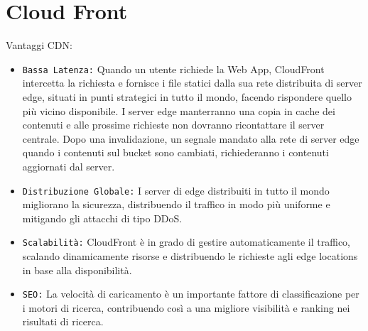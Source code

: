 \section{Cloud Front}

Vantaggi CDN:
\begin{itemize}
    \item \texttt{Bassa Latenza:} Quando un utente richiede la Web App, CloudFront intercetta la richiesta e fornisce i file statici dalla sua rete distribuita di server edge, situati in punti strategici in tutto il mondo, facendo rispondere quello più vicino disponibile. I server edge manterranno una copia in cache dei contenuti e alle prossime richieste non dovranno ricontattare il server centrale. Dopo una invalidazione, un segnale mandato alla rete di server edge quando i contenuti sul bucket sono cambiati, richiederanno i contenuti aggiornati dal server.
    \item \texttt{Distribuzione Globale:} I server di edge distribuiti in tutto il mondo migliorano la sicurezza, distribuendo il traffico in modo più uniforme e mitigando gli attacchi di tipo DDoS.
    \item \texttt{Scalabilità:} CloudFront è in grado di gestire automaticamente il traffico, scalando dinamicamente risorse e distribuendo le richieste agli edge locations in base alla disponibilità.
    \item \texttt{SEO:} La velocità di caricamento è un importante fattore di classificazione per i motori di ricerca, contribuendo così a una migliore visibilità e ranking nei risultati di ricerca.
\end{itemize}
